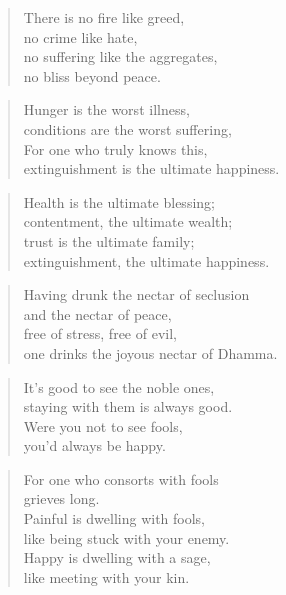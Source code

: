 \documentclass[12pt,openany]{book}%
\begin{document}
\begin{verse}%
There is no fire like greed, \\
no crime like hate, \\
no suffering like the aggregates, \\
no bliss beyond peace. 

%
\end{verse}

\begin{verse}%
Hunger is the worst illness, \\
conditions are the worst suffering, \\
For one who truly knows this, \\
extinguishment is the ultimate happiness. 

%
\end{verse}

\begin{verse}%
Health is the ultimate blessing; \\
contentment, the ultimate wealth; \\
trust is the ultimate family; \\
extinguishment, the ultimate happiness. 

%
\end{verse}

\begin{verse}%
Having drunk the nectar of seclusion \\
and the nectar of peace, \\
free of stress, free of evil, \\
one drinks the joyous nectar of Dhamma. 

%
\end{verse}

\begin{verse}%
It’s good to see the noble ones, \\
staying with them is always good. \\
Were you not to see fools, \\
you’d always be happy. 

%
\end{verse}

\begin{verse}%
For one who consorts with fools \\
grieves long. \\
Painful is dwelling with fools, \\
like being stuck with your enemy. \\
Happy is dwelling with a sage, \\
like meeting with your kin. 

%
\end{verse}
\end{document}
